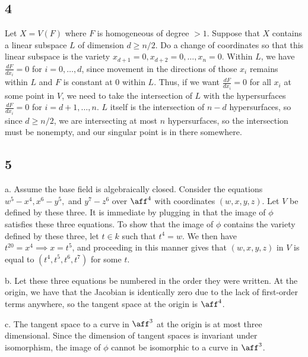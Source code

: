 \documentclass{article}
\begin{document}
\subsection*{4}
Let $X=V(F)$ where $F$ is homogeneous of degree $>1$. Suppose that $X$ contains a linear subspace $L$ of dimension $d\geq n/2$. Do a change of coordinates so that this linear subspace is the variety $x_{d+1}=0,x_{d+2}=0,\ldots,x_n=0$. Within $L$, we have $\frac{dF}{dx_i}=0$ for $i=0,\ldots,d$, since movement in the directions of those $x_i$ remains within $L$ and $F$ is constant at $0$ within $L$. Thus, if we want $\frac{dF}{dx_i}=0$ for all $x_i$ at some point in $V$, we need to take the intersection of $L$ with the hypersurfaces $\frac{dF}{dx_i}=0$ for $i=d+1,\ldots,n$. $L$ itself is the intersection of $n-d$ hypersurfaces, so since $d\geq n/2$, we are intersecting at most $n$ hypersurfaces, so the intersection must be nonempty, and our singular point is in there somewhere.
\subsection*{5}
a. Assume the base field is algebraically closed. Consider the equations $w^5-x^4,x^6-y^5,$ and $y^7-z^6$ over $\aff^4$ with coordinates $(w,x,y,z)$. Let $V$ be defined by these three. It is immediate by plugging in that the image of $\phi$ satisfies these three equations. To show that the image of $\phi$ contains the variety defined by these three, let $t\in k$ such that $t^4=w$. We then have $t^{20}=x^4\implies x=t^5$, and proceeding in this manner gives that $(w,x,y,z)$ in $V$ is equal to $(t^4,t^5,t^6,t^7)$ for some $t$.

b. Let these three equations be numbered in the order they were written. At the origin, we have that the Jacobian is identically zero due to the lack of first-order terms anywhere, so the tangent space at the origin is $\aff^4$.

c. The tangent space to a curve in $\aff^3$ at the origin is at most three dimensional. Since the dimension of tangent spaces is invariant under isomorphism, the image of $\phi$ cannot be isomorphic to a curve in $\aff^3$.
\end{document}

